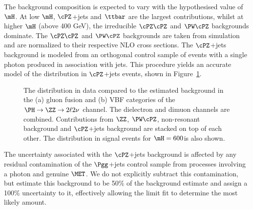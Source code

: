 The background composition is expected to vary with the hypothesised value of $\mH$. At low $\mH$, $\cPZ$+jets
and $\ttbar$ are the largest contributions, whilst at higher $\mH$ (above 400 GeV), the irreducible $\cPZ\cPZ$ and
$\PW\cPZ$ backgrounds dominate. The $\cPZ\cPZ$ and $\PW\cPZ$ backgrounds are taken from simulation and are
normalized to their respective NLO cross sections. The $\cPZ$+jets background is modeled from an orthogonal control
sample of events with a single photon produced in association with jets. This procedure yields an accurate model of
the \MET distribution in $\cPZ$+jets events, shown in Figure~\ref{fig:zgamma_met_data}.

\begin{figure}[htbp]
\begin{center}
\caption{The \MET distribution in data compared to the estimated background
in the (a) gluon fusion and (b) VBF categories {of the $\PH \to \ZZ \to 2\ell 2\nu$ channel}. 
The dielectron and dimuon channels are combined.
Contributions from $\ZZ$, $\PW\cPZ$, non-resonant background and $\cPZ$+jets background are stacked
on top of each other. The \MET distribution in signal events for $\mH = 600$\GeV is also shown.} 
\label{fig:zgamma_met_data}
\end{center}
\end{figure}

The uncertainty associated with the $\cPZ$+jets background is affected by any residual contamination of the
$\Pgg$+jets control sample from processes involving a photon and genuine $\MET$. We do not explicitly subtract this
contamination, but estimate this background to be 50\% of the background estimate and assign a 100\% uncertainty to it, effectively allowing the limit fit to determine the most likely amount. 

